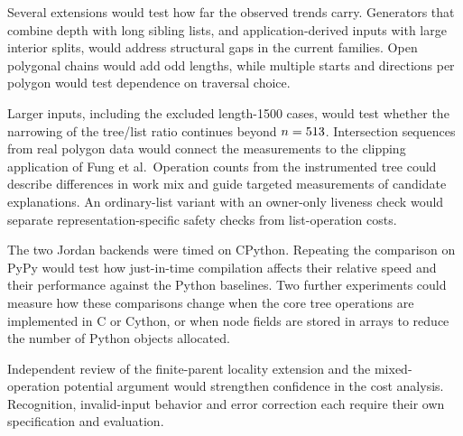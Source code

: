 Several extensions would test how far the observed trends carry. Generators
that combine depth with long sibling lists, and application-derived inputs
with large interior splits, would address structural gaps in the current
families. Open polygonal chains would add odd lengths, while multiple starts
and directions per polygon would test dependence on traversal choice.

Larger inputs, including the excluded length-1500 cases, would test whether
the narrowing of the tree/list ratio continues beyond $n=513{}$.
Intersection sequences from real polygon data would connect the measurements
to the clipping application of Fung et al.\ Operation counts from the
instrumented tree could describe differences in work mix and guide targeted
measurements of candidate explanations. An ordinary-list variant with an
owner-only liveness check would separate representation-specific safety checks
from list-operation costs.

The two Jordan backends were timed on CPython.
Repeating the comparison on PyPy would test how just-in-time compilation
affects their relative speed and their performance against the Python
baselines. Two further experiments could measure how these comparisons change when the core tree operations are
implemented in C or Cython, or when node fields are stored in arrays to
reduce the number of Python objects allocated.

Independent review of the finite-parent locality extension and
the mixed-operation potential argument would strengthen confidence in the
cost analysis. Recognition, invalid-input behavior and error correction each
require their own specification and evaluation.
